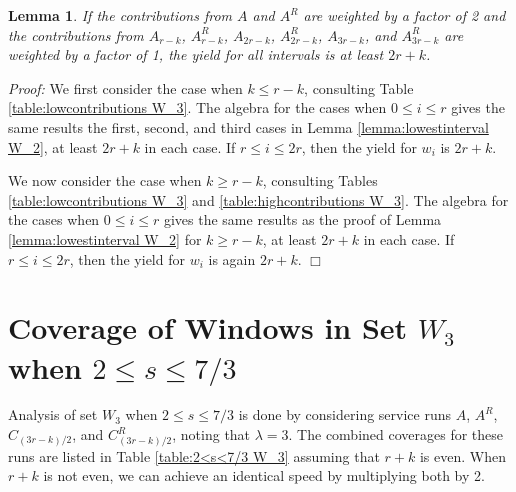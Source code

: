 \documentclass[11pt]{article}
\newtheorem{lemma}{Lemma}[section]
\newcommand\QED{\ifhmode\allowbreak\else\nobreak\fi
\quad\nobreak$\Box$\medbreak}
\newcommand{\proofstart}{\par\noindent \emph{Proof:} }
\newcommand{\proofend}{\QED\par}
\newenvironment{proof}{\proofstart}{\proofend}
\begin{document}
\begin{lemma}\label{lemma:lowestinterval W_3}
If the contributions from $A$ and $A^R$ are weighted by a factor of 2 and the contributions from $A_{r - k}$, $A_{r - k}^R$, $A_{2r - k}$, $A_{2r - k}^R$, $A_{3r - k}$, and $A_{3r - k}^R$ are weighted by a factor of 1, the yield for all intervals is at least $2r + k$.
\end{lemma}

\begin{proof}
We first consider the case when $k \leq r - k$, consulting Table \ref{table:lowcontributions W_3}.  The algebra for the cases when $0 \leq i \leq r$ gives the same results the first, second, and third cases in Lemma \ref{lemma:lowestinterval W_2}, at least $2r + k$  in each case.  If $r \leq i \leq 2r$, then the yield for $w_i$ is $2r + k$.

We now consider the case when $k \geq r - k$, consulting Tables  \ref{table:lowcontributions W_3} and \ref{table:highcontributions W_3}.  The algebra for the cases when $0 \leq i \leq r$ gives the same results as the proof of Lemma \ref{lemma:lowestinterval W_2} for $k \geq r - k$, at least $2r + k$ in each case.  If $r \leq i \leq 2r$, then the yield for $w_i$ is again $2r + k$.
\end{proof}



\section{Coverage of Windows in Set $W_3$ when $2 \leq s \leq 7/3$}
\label{appendix:2<s<7/3 W_3}

Analysis of set $W_3$ when $2 \leq s \leq 7/3$ is done by considering service runs $A$, $A^R$, $C_{(3r - k)/2}$, and $C_{(3r - k)/2}^R$, noting that $\lambda = 3$. The combined coverages for these runs are listed in Table \ref{table:2<s<7/3 W_3} assuming that $r + k$ is even.  When $r + k$ is not even, we can achieve an identical speed by multiplying both by 2.\\
\end{document}
